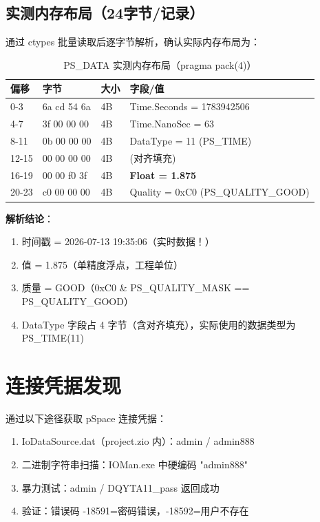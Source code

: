 \documentclass[12pt,a4paper]{ctexart}
\begin{document}
\subsection{实测内存布局（24字节/记录）}
通过 ctypes 批量读取后逐字节解析，确认实际内存布局为：

\begin{table}[H]\centering
\caption{PS\_DATA 实测内存布局（pragma pack(4)）}
\begin{tabular}{llll}
\toprule
\textbf{偏移} & \textbf{字节} & \textbf{大小} & \textbf{字段/值} \\
\midrule
0-3   & 6a cd 54 6a & 4B & Time.Seconds = 1783942506 \\
4-7   & 3f 00 00 00 & 4B & Time.NanoSec = 63 \\
8-11  & 0b 00 00 00 & 4B & DataType = 11 (PS\_TIME) \\
12-15 & 00 00 00 00 & 4B & (对齐填充) \\
16-19 & 00 00 f0 3f & 4B & \textbf{Float = 1.875} \\
20-23 & c0 00 00 00 & 4B & Quality = 0xC0 (PS\_QUALITY\_GOOD) \\
\bottomrule
\end{tabular}
\end{table}

\textbf{解析结论}：
\begin{enumerate}[leftmargin=*]
  \item 时间戳 = 2026-07-13 19:35:06（实时数据！）
  \item 值 = 1.875（单精度浮点，工程单位）
  \item 质量 = GOOD（0xC0 \& PS\_QUALITY\_MASK == PS\_QUALITY\_GOOD）
  \item DataType 字段占 4 字节（含对齐填充），实际使用的数据类型为 PS\_TIME(11)
\end{enumerate}

\section{连接凭据发现}

通过以下途径获取 pSpace 连接凭据：
\begin{enumerate}[leftmargin=*]
  \item IoDataSource.dat（project.zio 内）：admin / admin888
  \item 二进制字符串扫描：IOMan.exe 中硬编码 "admin888"
  \item 暴力测试：admin / DQYTA11\_pass 返回成功
  \item 验证：错误码 -18591=密码错误，-18592=用户不存在
\end{enumerate}
\end{document}
